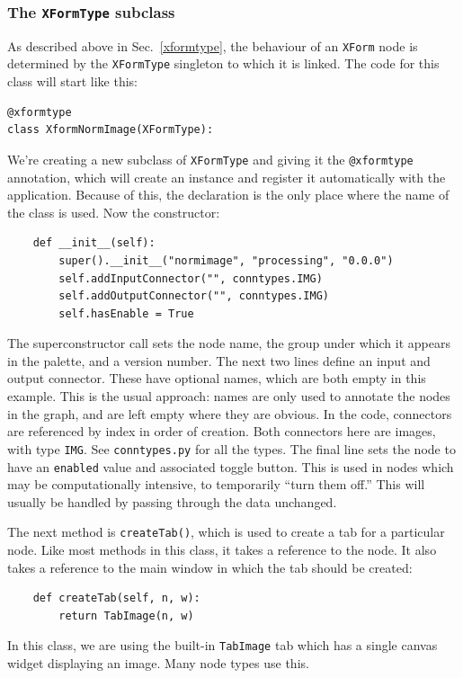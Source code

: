 \subsubsection{The \texttt{XFormType} subclass}
As described above in Sec.~\ref{xformtype}, the behaviour of an \texttt{XForm} node is determined
by the \texttt{XFormType} singleton to which it is linked. The code for this class will start like this:
\begin{lstlisting}
@xformtype
class XformNormImage(XFormType):
\end{lstlisting}
We're creating a new subclass of \texttt{XFormType} and giving it the
\texttt{@xformtype} annotation, which will create an instance and register it
automatically with the application. Because of this, the declaration is the
only place where the name of the class is used. Now the constructor:
\begin{lstlisting}
    def __init__(self):
        super().__init__("normimage", "processing", "0.0.0")
        self.addInputConnector("", conntypes.IMG)
        self.addOutputConnector("", conntypes.IMG)
        self.hasEnable = True
\end{lstlisting}
The superconstructor call sets the node name, the group under which it appears
in the palette, and a version number. The next two lines define an input and
output connector. These have optional names, which are both empty in this
example. This is the usual approach: names are only used to annotate the nodes
in the graph, and are left empty where they are obvious. In the code,
connectors are referenced by index in order of creation. Both connectors here
are images, with type \texttt{IMG}. See \texttt{conntypes.py} for all the
types. The final line sets the node to have an \texttt{enabled} value and
associated toggle button. This is used in nodes which may be computationally
intensive, to temporarily ``turn them off.'' This will usually be handled by
passing through the data unchanged.

The next method is \texttt{createTab()}, which is used to create a tab for a particular node. Like most
methods in this class, it takes a reference to the node. It also takes a reference to the main window
in which the tab should be created:
\begin{lstlisting}
    def createTab(self, n, w):
        return TabImage(n, w)
\end{lstlisting}
In this class, we are using the built-in \texttt{TabImage} tab which has a single canvas widget
displaying an image. Many node types use this.


